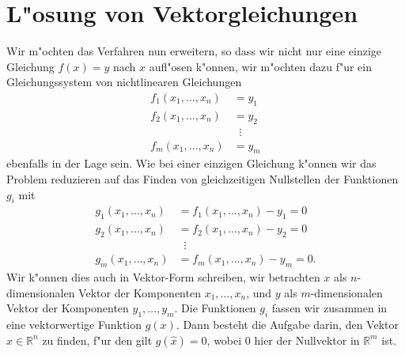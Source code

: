 \section{L"osung von Vektorgleichungen\label{section:newton:vektor}}
Wir m"ochten das Verfahren nun erweitern, so dass wir nicht nur eine
einzige Gleichung $f(x)=y$ nach $x$ aufl"osen k"onnen, wir m"ochten dazu 
f"ur ein Gleichungssystem von nichtlinearen Gleichungen
\begin{align*}
f_1(x_1,\dots,x_n)&=y_1\\
f_2(x_1,\dots,x_n)&=y_2\\
&\;\;\vdots\\
f_m(x_1,\dots,x_n)&=y_m
\end{align*}
ebenfalls in der Lage sein.
Wie bei einer einzigen Gleichung k"onnen wir das Problem reduzieren
auf das Finden von gleichzeitigen Nullstellen der Funktionen $g_i$ mit
\begin{align*}
g_1(x_1,\dots,x_n)&=f_1(x_1,\dots,x_n)-y_1=0\\
g_2(x_1,\dots,x_n)&=f_2(x_1,\dots,x_n)-y_2=0\\
&\;\;\vdots\\
g_m(x_1,\dots,x_n)&=f_m(x_1,\dots,x_n)-y_m=0.
\end{align*}
Wir k"onnen dies auch in Vektor-Form schreiben,
wir betrachten $x$ als $n$-dimensionalen Vektor der Komponenten
$x_1,\dots,x_n$, und $y$ als $m$-dimensionalen Vektor der Komponenten
$y_1,\dots,y_m$.
Die Funktionen $g_i$ fassen wir zusammen in eine vektorwertige Funktion
$g(x)$.
Dann besteht die Aufgabe darin, den Vektor $\hat{x}\in\mathbb R^n$ zu
finden, f"ur den  gilt $g(\hat{x})=0$, wobei $0$ hier der Nullvektor
in $\mathbb R^m$ ist.

